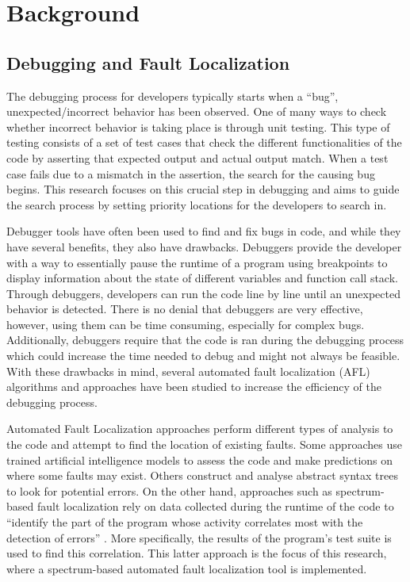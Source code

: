 \section{Background}
\label{sec:background}

\subsection{Debugging and Fault Localization}
\label{subsec:DebuggingAndAFL}

The debugging process for developers typically starts when a ``bug'',
unexpected/incorrect behavior has been observed. One of many ways to check
whether incorrect behavior is taking place is through unit testing. This type of
testing consists of a set of test cases that check the different functionalities of the
code by asserting that expected output and actual output match. When a test case
fails due to a mismatch in the assertion, the search for the causing bug begins.
This research focuses on this crucial step in debugging and aims to guide the
search process by setting priority locations for the developers to search in.

Debugger tools have often been used to find and fix bugs in code, and while they
have several benefits, they also have drawbacks. Debuggers provide the developer
with a way to essentially pause the runtime of a program using breakpoints to display
information about the state of different variables and function call stack.
Through debuggers, developers can run the code line by line until an unexpected
behavior is detected. There is no denial that debuggers are very effective,
however, using them can be time consuming, especially for complex bugs.
Additionally, debuggers require that the code is ran during the debugging
process which could increase the time needed to debug and might not always be
feasible. With these drawbacks in mind, several automated fault localization (AFL)
algorithms and approaches have been studied to increase the
efficiency of the debugging process.

Automated Fault Localization approaches perform different types of analysis to
the code and attempt to find the location of existing faults. Some approaches
use trained artificial intelligence models to assess the code and make
predictions on where some faults may exist. Others construct and analyse
abstract syntax trees to look for potential errors. On the other hand,
approaches such as spectrum-based fault localization rely on data collected
during the runtime of the code to ``identify the part of the program whose
activity correlates most with the detection of errors'' \cite{ABREU20091780}.
More specifically, the results of the program's test suite is used to find this
correlation. This latter approach is the focus of this research, where a
spectrum-based automated fault localization tool is implemented.

